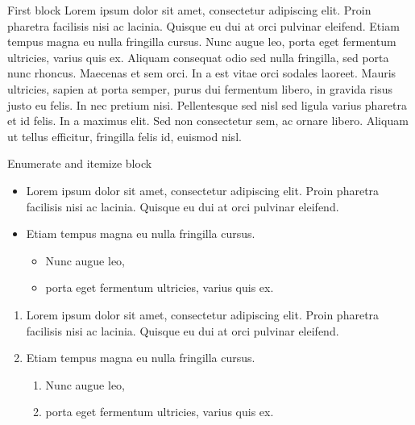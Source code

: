 \documentclass[english,xcolor=table,t]{beamer}
\begin{document}
\begin{frame}
\begin{columns}
\begin{vfillcolumn}{\colwidth}
\begin{block}{First block}
Lorem ipsum dolor sit amet, consectetur adipiscing elit. Proin pharetra facilisis nisi ac lacinia. Quisque eu dui at orci pulvinar eleifend. Etiam tempus magna eu nulla fringilla cursus. Nunc augue leo, porta eget fermentum ultricies, varius quis ex. Aliquam consequat odio sed nulla fringilla, sed porta nunc rhoncus. Maecenas et sem orci. In a est vitae orci sodales laoreet. Mauris ultricies, sapien at porta semper, purus dui fermentum libero, in gravida risus justo eu felis. In nec pretium nisi. Pellentesque sed nisl sed ligula varius pharetra et id felis. In a maximus elit. Sed non consectetur sem, ac ornare libero. Aliquam ut tellus efficitur, fringilla felis id, euismod nisl.
\end{block}

\begin{block}{Enumerate and itemize block}
\begin{itemize}
\item Lorem ipsum dolor sit amet, consectetur adipiscing elit. Proin pharetra facilisis nisi ac lacinia. Quisque eu dui at orci pulvinar eleifend. 

\item Etiam tempus magna eu nulla fringilla cursus. 
\begin{itemize}
\item Nunc augue leo,
\item porta eget fermentum ultricies, varius quis ex. 
\end{itemize}
\end{itemize}

\begin{enumerate}
\item Lorem ipsum dolor sit amet, consectetur adipiscing elit. Proin pharetra facilisis nisi ac lacinia. Quisque eu dui at orci pulvinar eleifend. 

\item Etiam tempus magna eu nulla fringilla cursus. 
\begin{enumerate}
\item Nunc augue leo,
\item porta eget fermentum ultricies, varius quis ex. 
\end{enumerate}
\end{enumerate}


\end{block}
\end{vfillcolumn}
\end{columns}
\end{frame}
\end{document}
